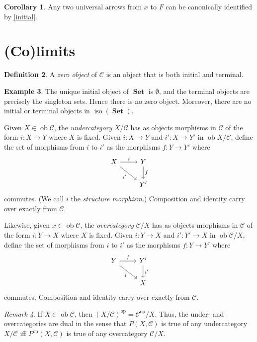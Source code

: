 \documentclass[10pt,letterpaper,cm]{nupset}
\theoremstyle{definition}
\newtheorem{definition}{Definition}[section]
\newtheorem{exmp}[definition]{Example}
\theoremstyle{theorem}
\newtheorem{corollary}[definition]{Corollary}
\theoremstyle{remark}
\newtheorem{remark}[definition]{Remark}
\newcommand{\1}{\mathbf{1}}
\renewcommand{\c}{\mathscr{C}}
\newcommand{\0}{\vec 0}
\DeclareMathOperator{\op}{op}
\DeclareMathOperator{\ob}{ob}
\DeclareMathOperator{\iso}{iso}
\DeclareMathOperator{\set}{\mathbf{Set}}
\begin{document}
\begin{corollary}
Any two universal arrows from $x$ to $F$ can be canonically identified by \cref{initial}.
\end{corollary}

\section{(Co)limits}

\begin{definition}
A \textit{zero object} of $\c$ is an object that is both initial and terminal.
\end{definition}

\begin{exmp}
The unique initial object of $\set$ is $\emptyset$, and the terminal objects are precisely the singleton sets. Hence there is no zero object. Moreover, there are no initial or terminal objects in $\iso(\set)$.
\end{exmp}


Given $X \in \ob \c$, the \textit{undercategory} ${X}/{\c}$ has as objects morphisms in $\c$ of the form $i : X \to Y$ where $X$ is fixed. Given $i: X \to Y$ and  $i' : X \to Y'$ in $\ob {X}/{\c}$, define the set of morphisms from $i$ to $i'$ as the morphisms $f: Y \to Y'$ where
\[ \begin{tikzcd}
X \arrow[r, "i"] \arrow[swap, dr,  " i' "] & Y \arrow[d, "f"] \\%
 & Y'
\end{tikzcd}
\]
commutes. (We call $i$ the \textit{structure morphism}.)
 Composition and identity carry over exactly from $\c$.

\medskip

Likewise, given $x \in \ob \c$, the \textit{overcategory} ${\c}/{X}$ has as objects morphisms in $\c$ of the form $i : Y \to X$ where $X$ is fixed. Given $i:  Y \to X$ and  $i' : Y' \to X$ in $\ob {\c}/{X}$, define the set of morphisms from $i$ to $i'$ as the morphisms $f: Y \to Y'$ where
\[ \begin{tikzcd}
Y \arrow[r, "f"] \arrow[swap, dr,  " i "] & Y' \arrow[d, "i '"] \\%
 & X
\end{tikzcd}
\]
commutes.
 Composition and identity carry over exactly from $\c$.


\begin{remark}
If $X \in \ob \c$, then $\left({X}/{\c}\right)^{\op} = {\c^{\op}}/{X}$. Thus, the under- and overcategories are dual in the sense that $P(X, \c)$ is true of any undercategory ${X}/{\c}$ iff $P^{\op}(X, \c)$ is true of any overcategory ${\c}/{X}$. 
\end{remark}
\end{document}
